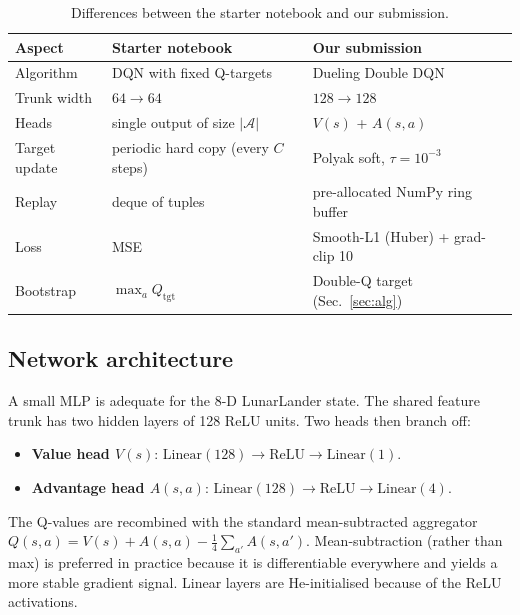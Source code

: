 \documentclass[11pt,a4paper]{article}
\begin{document}
\begin{table}[h]
\centering\small
\caption{Differences between the starter notebook and our submission.}
\label{tab:starter-vs-ours}
\begin{tabular}{lll}
\toprule
\textbf{Aspect} & \textbf{Starter notebook} & \textbf{Our submission} \\
\midrule
Algorithm & DQN with fixed Q-targets & Dueling Double DQN \\
Trunk width & $64\!\to\!64$ & $128\!\to\!128$ \\
Heads & single output of size $|\mathcal{A}|$ & $V(s)$ + $A(s, a)$ \\
Target update & periodic hard copy (every $C$ steps) & Polyak soft, $\tau\!=\!10^{-3}$ \\
Replay & deque of tuples & pre-allocated NumPy ring buffer \\
Loss & MSE & Smooth-L1 (Huber) + grad-clip 10 \\
Bootstrap & $\max_a Q_{\text{tgt}}$ & Double-Q target (Sec.~\ref{sec:alg}) \\
\bottomrule
\end{tabular}
\end{table}

\subsection{Network architecture}
A small MLP is adequate for the 8-D LunarLander state. The shared
feature trunk has two hidden layers of 128 ReLU units. Two heads then
branch off:
\begin{itemize}
  \item \textbf{Value head $V(s)$}: $\text{Linear}(128) \to \text{ReLU} \to \text{Linear}(1)$.
  \item \textbf{Advantage head $A(s, a)$}: $\text{Linear}(128) \to \text{ReLU} \to \text{Linear}(4)$.
\end{itemize}
The Q-values are recombined with the standard mean-subtracted
aggregator $Q(s, a) = V(s) + A(s, a) - \tfrac{1}{4}\sum_{a'} A(s, a')$.
Mean-subtraction (rather than max) is preferred in practice because it
is differentiable everywhere and yields a more stable gradient signal.
Linear layers are He-initialised because of the ReLU activations.
\end{document}
